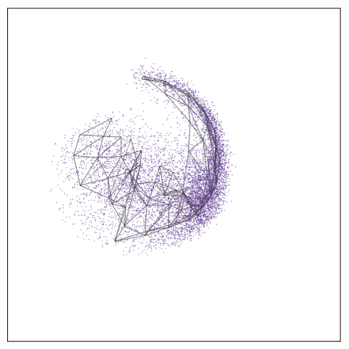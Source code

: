 \documentclass[
  12pt]{article}
\begin{document}
\begin{figure}[H]
\begin{minipage}[t]{0.33\linewidth}
{{\includegraphics{figures/mnist/sc_2.png}

}

}

\subcaption{\label{fig-mnist1_sc2}}
\end{minipage}%
%
\begin{minipage}[t]{0.33\linewidth}

{\centering 

}
\end{minipage}
\end{figure}
\end{document}
